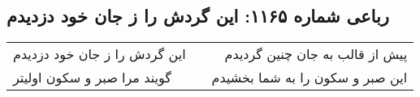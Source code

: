 \begin{center}
\section*{رباعی شماره ۱۱۶۵: این گردش را ز جان خود دزدیدم}
\label{sec:1165}
\begin{longtable}{l p{0.5cm} r}
این گردش را ز جان خود دزدیدم
&&
پیش از قالب به جان چنین گردیدم
\\
گویند مرا صبر و سکون اولیتر
&&
این صبر و سکون را به شما بخشیدم
\\
\end{longtable}
\end{center}
